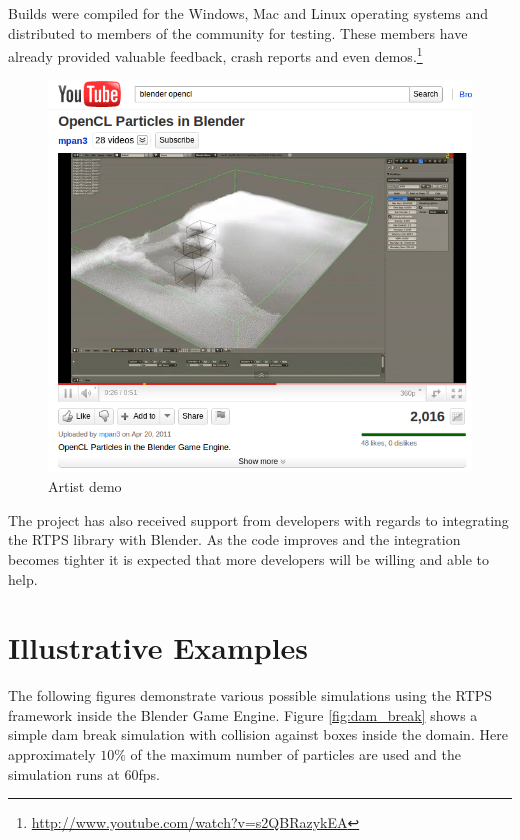 {Builds were compiled for the Windows, Mac and Linux operating systems and
distributed to members of the community for testing. These members have already
provided valuable feedback, crash reports and even demos.\footnote{ \url{http://www.youtube.com/watch?v=s2QBRazykEA}} 

\begin{figure}[!htc]
 		\centering
		\includegraphics[scale=0.75]{figures/youtube.png}
        \caption{ Artist demo }
		\label{fig:mpan}
\end{figure}

The project has also received support from developers with regards to
integrating the RTPS library with Blender. As the code improves and the
integration becomes tighter it is expected that more developers will be willing
and able to help.

\pagebreak

\section{Illustrative Examples}

The following figures demonstrate various possible simulations using the RTPS
framework inside the Blender Game Engine. Figure \ref{fig:dam_break} shows a
simple dam break simulation with collision against boxes inside the domain.
Here approximately $10\%$ of the maximum number of particles are used and the simulation runs at 60fps.

}
